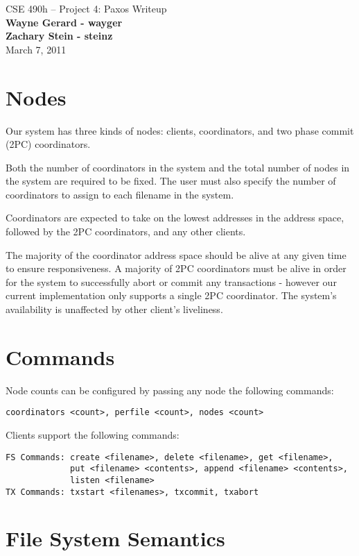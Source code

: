 \documentclass[11pt]{article}
\begin{document}
\begin{center}
{\large CSE 490h -- Project 4: Paxos Writeup} \\
\textbf{Wayne Gerard - wayger} \\
\textbf{Zachary Stein - steinz} \\
March 7, 2011
\end{center}

\section{Nodes}

Our system has three kinds of nodes: clients, coordinators, and two phase commit (2PC) coordinators.

Both the number of coordinators in the system and the total number of nodes in the system are required to be fixed.
The user must also specify the number of coordinators to assign to each filename in the system.

Coordinators are expected to take on the lowest addresses in the address space, followed by the 2PC coordinators, and any other clients.

The majority of the coordinator address space should be alive at any given time to ensure responsiveness. 
A majority of 2PC coordinators must be alive in order for the system to successfully abort or commit any transactions - 
however our current implementation only supports a single 2PC coordinator.
The system's availability is unaffected by other client's liveliness.

\section{Commands} 

Node counts can be configured by passing any node the following commands:
\begin{verbatim}
coordinators <count>, perfile <count>, nodes <count>
\end{verbatim}

Clients support the following commands:
\begin{verbatim}
FS Commands: create <filename>, delete <filename>, get <filename>, 
             put <filename> <contents>, append <filename> <contents>,
             listen <filename>
TX Commands: txstart <filenames>, txcommit, txabort
\end{verbatim}

\section{File System Semantics} 
\end{document}
